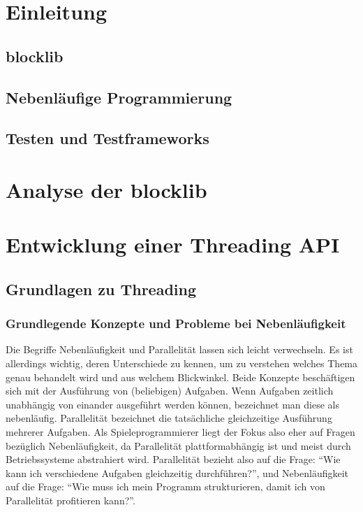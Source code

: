 \documentclass[parskip=half,twoside,BCOR=2cm,11pt,DIV=10]{scrreprt}
\begin{document}

\null\thispagestyle{empty}\clearpage
\tableofcontents
\chapter{Einleitung}
\section{blocklib}
\section{Nebenläufige Programmierung}
\section{Testen und Testframeworks}

\chapter{Analyse der blocklib}


\chapter{Entwicklung einer Threading API}

\section{Grundlagen zu Threading}
\subsection{Grundlegende Konzepte und Probleme bei Nebenläufigkeit}
Die Begriffe Nebenläufigkeit und Parallelität lassen sich leicht verwechseln. Es ist allerdings wichtig, deren Unterschiede zu kennen, um zu verstehen welches Thema genau behandelt wird und aus welchem Blickwinkel. Beide Konzepte beschäftigen sich mit der Ausführung von (beliebigen) Aufgaben. Wenn Aufgaben zeitlich unabhängig von einander ausgeführt werden können, bezeichnet man diese als nebenläufig. Parallelität bezeichnet die tatsächliche gleichzeitige Ausführung mehrerer Aufgaben. Als Spieleprogrammierer liegt der Fokus also eher auf Fragen bezüglich Nebenläufigkeit, da Parallelität plattformabhängig ist und meist durch Betriebssysteme abstrahiert wird. Parallelität bezieht also auf die Frage: \enquote{Wie kann ich verschiedene Aufgaben gleichzeitig durchführen?}, und Nebenläufigkeit auf die Frage: \enquote{Wie muss ich mein Programm strukturieren, damit ich von Parallelität profitieren kann?}. 
\end{document}
